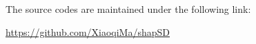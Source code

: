 The source codes are maintained under the following link:

\url{https://github.com/XiaoqiMa/shapSD}



